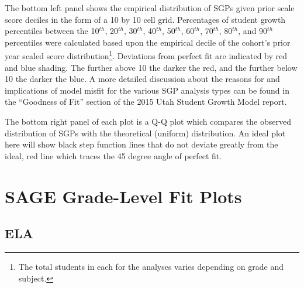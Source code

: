\documentclass[12pt]{article}
\begin{document}
The bottom left panel shows the empirical distribution of SGPs given
prior scale score deciles in the form of a 10 by 10 cell grid.
Percentages of student growth percentiles between the 10\(^{th}\),
20\(^{th}\), 30\(^{th}\), 40\(^{th}\), 50\(^{th}\), 60\(^{th}\),
70\(^{th}\), 80\(^{th}\), and 90\(^{th}\) percentiles were calculated
based upon the empirical decile of the cohort's prior year scaled score
distribution\footnote{The total students in each for the analyses varies
  depending on grade and subject.}. Deviations from perfect fit are
indicated by red and blue shading. The further above 10 the darker the
red, and the further below 10 the darker the blue. A more detailed
discussion about the reasons for and implications of model misfit for
the various SGP analysis types can be found in the ``Goodness of Fit''
section of the 2015 Utah Student Growth Model report.

The bottom right panel of each plot is a Q-Q plot which compares the
observed distribution of SGPs with the theoretical (uniform)
distribution. An ideal plot here will show black step function lines
that do not deviate greatly from the ideal, red line which traces the 45
degree angle of perfect fit.

\section{SAGE Grade-Level Fit Plots}\label{sage-grade-level-fit-plots}

\subsection{ELA}\label{ela}
\end{document}
